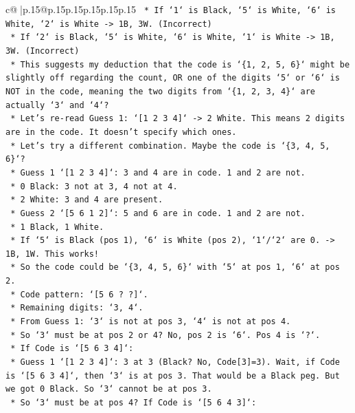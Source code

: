\documentclass{article}
\begin{document}
{\begin{supertabular}{c@{$\;$}|p{.15\linewidth}@{}p{.15\linewidth}p{.15\linewidth}p{.15\linewidth}p{.15\linewidth}p{.15\linewidth}}
{{{\texttt{        *   If `1` is Black, `5` is White, `6` is White, `2` is White {-}> 1B, 3W. (Incorrect)} \\
\texttt{        *   If `2` is Black, `5` is White, `6` is White, `1` is White {-}> 1B, 3W. (Incorrect)} \\
\texttt{    *   This suggests my deduction that the code is `\{1, 2, 5, 6\}` might be slightly off regarding the count, OR one of the digits `5` or `6` is NOT in the code, meaning the two digits from `\{1, 2, 3, 4\}` are actually `3` and `4`?} \\
\texttt{    *   Let's re{-}read Guess 1: `{[}1 2 3 4{]}` {-}> 2 White. This means 2 digits are in the code. It doesn't specify which ones.} \\
\texttt{    *   Let's try a different combination. Maybe the code is `\{3, 4, 5, 6\}`?} \\
\texttt{        *   Guess 1 `{[}1 2 3 4{]}`: 3 and 4 are in code. 1 and 2 are not.} \\
\texttt{        *   0 Black: 3 not at 3, 4 not at 4.} \\
\texttt{        *   2 White: 3 and 4 are present.} \\
\texttt{        *   Guess 2 `{[}5 6 1 2{]}`: 5 and 6 are in code. 1 and 2 are not.} \\
\texttt{        *   1 Black, 1 White.} \\
\texttt{        *   If `5` is Black (pos 1), `6` is White (pos 2), `1`/`2` are 0. {-}> 1B, 1W. This works!} \\
\texttt{        *   So the code could be `\{3, 4, 5, 6\}` with `5` at pos 1, `6` at pos 2.} \\
\texttt{        *   Code pattern: `{[}5 6 ? ?{]}`.} \\
\texttt{        *   Remaining digits: `3, 4`.} \\
\texttt{        *   From Guess 1: `3` is not at pos 3, `4` is not at pos 4.} \\
\texttt{        *   So `3` must be at pos 2 or 4? No, pos 2 is `6`. Pos 4 is `?`.} \\
\texttt{        *   If Code is `{[}5 6 3 4{]}`:} \\
\texttt{            *   Guess 1 `{[}1 2 3 4{]}`: 3 at 3 (Black? No, Code{[}3{]}=3). Wait, if Code is `{[}5 6 3 4{]}`, then `3` is at pos 3. That would be a Black peg. But we got 0 Black. So `3` cannot be at pos 3.} \\
\texttt{            *   So `3` must be at pos 4? If Code is `{[}5 6 4 3{]}`:} \\
}}}
\end{supertabular}}
\end{document}

